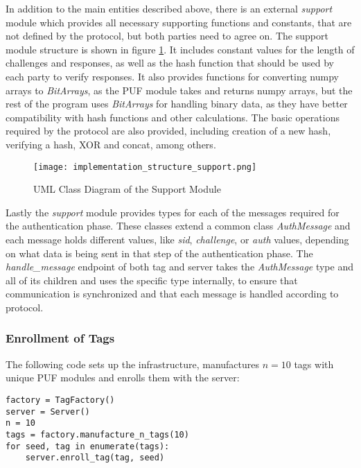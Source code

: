 In addition to the main entities described above, there is an external \emph{support} module which provides
all necessary supporting functions and constants, that are not defined by the protocol, but both parties need
to agree on.
The support module structure is shown in figure \ref{fig:implementation_structure_support}.
It includes constant values for the length of challenges and responses, as well as the hash function that
should be used by each party to verify responses.
It also provides functions for converting numpy arrays to \emph{BitArrays}, as the PUF module takes and returns
numpy arrays, but the rest of the program uses \emph{BitArrays} for handling binary data, as they
have better compatibility with hash functions and other calculations.
The basic operations required by the protocol are also provided, including creation of
a new hash, verifying a hash, XOR and concat, among others.

\begin{figure}[H]
    \centering
    \caption{UML Class Diagram of the Support Module}
    \label{fig:implementation_structure_support}
    \texttt{[image: implementation\_structure\_support.png]}
\end{figure}

Lastly the \emph{support} module provides types for each of the messages required for the authentication phase.
These classes extend a common class \emph{AuthMessage} and each message holds different values, like \emph{sid}, \emph{challenge},
or \emph{auth} values, depending on what data is being sent in that step of the authentication phase.
The \emph{handle\_message} endpoint of both tag and server takes the \emph{AuthMessage} type and all of its children
and uses the specific type internally, to ensure that communication is synchronized and that
each message is handled according to protocol.

\subsubsection{Enrollment of Tags}

The following code sets up the infrastructure,
manufactures $n = 10$ tags with unique PUF modules and enrolls them with the server:

\begin{lstlisting}
factory = TagFactory()
server = Server()
n = 10
tags = factory.manufacture_n_tags(10)
for seed, tag in enumerate(tags):
    server.enroll_tag(tag, seed)
\end{lstlisting}

